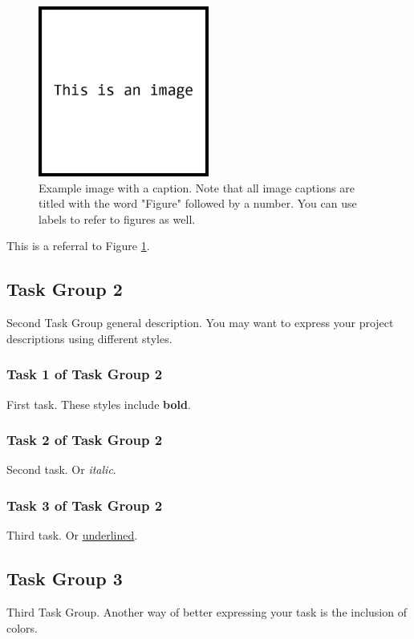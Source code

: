 \documentclass[a4paper]{article}
\begin{document}
\begin{figure}[!htb]
\centering
\includegraphics[width=0.5\textwidth]{image.png}
\caption{Example image with a caption. Note that all image captions are titled with the word "Figure" followed by a number. You can use labels to refer to figures as well.}\label{fig:image}
\end{figure}

This is a referral to Figure \ref{fig:image}. 

\subsection{Task Group 2}
Second Task Group general description. You may want to express your project descriptions using different styles.

\subsubsection{Task 1 of Task Group 2}
First task. These styles include \textbf{bold}.

\subsubsection{Task 2 of Task Group 2}
Second task. Or \emph{italic}.

\subsubsection{Task 3 of Task Group 2}
Third task. Or \underline{underlined}.

\subsection{Task Group 3}
Third Task Group. Another way of better expressing your task is the inclusion of colors.
\end{document}
